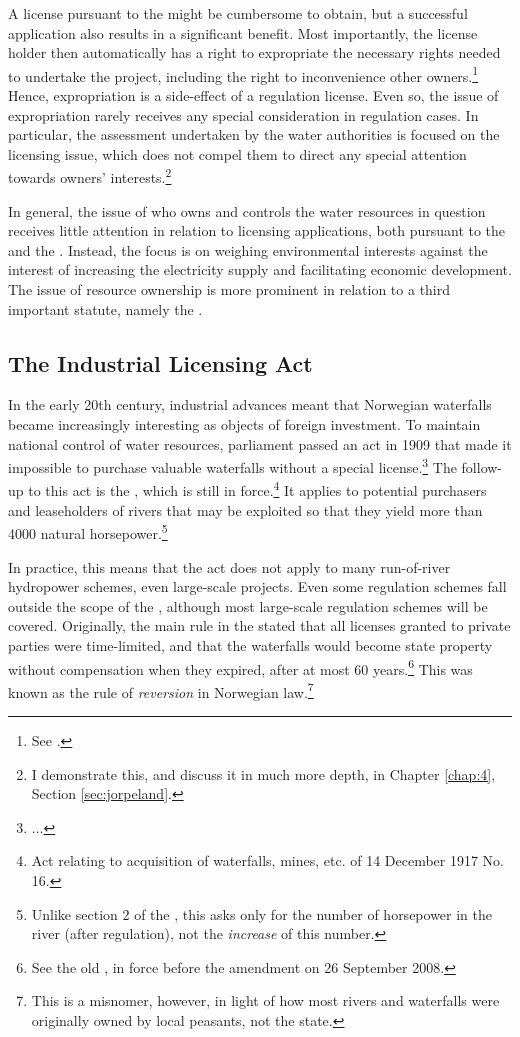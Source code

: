 A license pursuant to the \cite{wra17} might be cumbersome to obtain, but a successful application also results in a significant benefit. Most importantly, the license holder then automatically has a right to expropriate the necessary rights needed to undertake the project, including the right to inconvenience other owners.\footnote{See \cite[16]{wra17}.} Hence, expropriation is a side-effect of a regulation license. Even so, the issue of expropriation rarely receives any special consideration in regulation cases. In particular, the assessment undertaken by the water authorities is focused on the licensing issue, which does not compel them to direct any special attention towards owners' interests.\footnote{I demonstrate this, and discuss it in much more depth, in Chapter \ref{chap:4}, Section \ref{sec:jorpeland}.}

In general, the issue of who owns and controls the water resources in question receives little attention in relation to licensing applications, both pursuant to the \cite{wra17} and the \cite{wra00}. Instead, the focus is on weighing environmental interests against the interest of increasing the electricity supply and facilitating economic development. The issue of resource ownership is more prominent in relation to a third important statute, namely the \cite{ica17}.

\subsection{The Industrial Licensing Act}\label{sec:ica17}

In the early 20th century, industrial advances meant that Norwegian waterfalls became increasingly interesting as objects of foreign investment. To maintain national control of water resources, parliament passed an act in 1909 that made it impossible to purchase valuable waterfalls without a special license.\footnote{...} The follow-up to this act is the \cite{ica17}, which is still in force.\footnote{Act relating to acquisition of waterfalls, mines, etc. of 14 December 1917 No. 16.} It applies to potential purchasers and leaseholders of rivers that may be exploited so that they yield more than 4000 natural horsepower.\footnote{Unlike section 2 of the \cite{wra17}, this asks only for the number of horsepower in the river (after regulation), not the {\it increase} of this number.}

In practice, this means that the act does not apply to many run-of-river hydropower schemes, even large-scale projects. Even some regulation schemes fall outside the scope of the \cite{ica17}, although most large-scale regulation schemes will be covered. Originally, the main rule in the \cite{ica17} stated that all licenses granted to private parties were time-limited, and that the waterfalls would become state property without compensation when they expired, after at most 60 years.\footnote{See the old \cite[2]{ica17}, in force before the amendment on 26 September 2008.} This was known as the rule of {\it reversion} in Norwegian law.\footnote{This is a misnomer, however, in light of how most rivers and waterfalls were originally owned by local peasants, not the state.}

